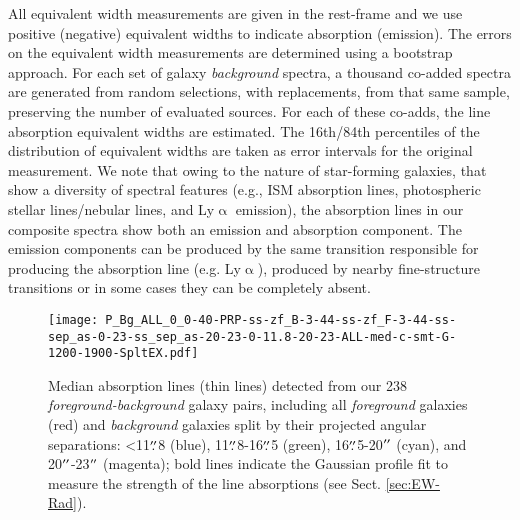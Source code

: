 \documentclass[longauth]{aa}
\begin{document}
All equivalent width measurements are given in the rest-frame and we use
positive (negative) equivalent widths to indicate absorption (emission). The
errors on the equivalent width measurements are determined using a bootstrap
approach. For each set of galaxy \textit{background} spectra, a thousand
co-added spectra are generated from random selections, with replacements, from
that same sample, preserving the number of evaluated sources. For each of
these co-adds, the line absorption equivalent widths are estimated. The 
16th/84th percentiles of the distribution of equivalent widths are taken as
error intervals for the original measurement. We note that owing to the nature 
of star-forming galaxies, that show a diversity of spectral features 
(e.g., ISM absorption lines, photospheric stellar lines/nebular lines, and
Ly$\upalpha$ emission), the absorption lines in our composite spectra show
both an emission and absorption component. The
emission components can be produced by the same transition responsible 
for producing the absorption line (e.g. Ly$\upalpha$), 
produced by nearby fine-structure transitions or 
in some cases they can be completely absent.

\begin{figure*}
\centering
\texttt{[image: P\_Bg\_ALL\_0\_0-40-PRP-ss-zf\_B-3-44-ss-zf\_F-3-44-ss-sep\_as-0-23-ss\_sep\_as-20-23-0-11.8-20-23-ALL-med-c-smt-G-1200-1900-SpltEX.pdf]}
  \caption{Median absorption lines (thin lines) detected from 
    our 238 \textit{foreground-background} galaxy pairs, including
    all \textit{foreground} galaxies (red) and \textit{background} galaxies
    split by their projected angular separations:
    <11$\overset{\prime\prime}{.}$8 (blue), 
    11$\overset{\prime\prime}{.}$8-16$\overset{\prime\prime}{.}$5 (green), 
    16$\overset{\prime\prime}{.}$5-20$^{\prime\prime}$ (cyan), and 
    20$^{\prime\prime}$-23$^{\prime\prime}$ (magenta); 
    bold lines indicate
    the Gaussian profile fit to measure the 
    strength of the line absorptions (see Sect. \ref{sec:EW-Rad}).}
\label{Fig:Lns-Bg-Sep-4}
\end{figure*}
\end{document}
